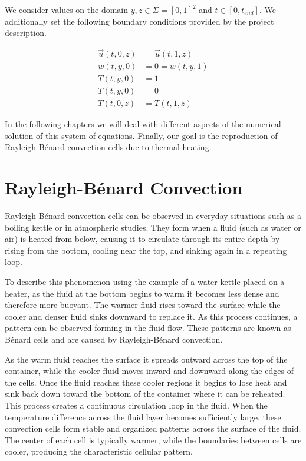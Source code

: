 We consider values on the domain $y,z \in \Sigma = [0,1]^2$ and $t \in [0, t_{end}]$.
We additionally set the following boundary conditions provided by the project description. 


\begin{align}
\vec u (t,0,z) &= \vec u (t,1,z) \\
w(t,y,0) &= 0 = w(t,y,1) \\
T(t,y,0) &= 1 \\
T(t,y,0) &= 0 \\
T(t,0,z) &= T(t,1,z) 
\end{align}

In the following chapters we will deal with different aspects of the numerical solution of this system of equations.
Finally, our goal is the reproduction of Rayleigh-B\'{e}nard convection cells due to thermal heating.






\section{Rayleigh-B\'{e}nard Convection}

Rayleigh-B\'{e}nard convection cells can be observed in everyday situations such as a boiling kettle or in atmospheric studies. They form when a fluid (such as water or air) is heated from below, causing it to circulate through its entire depth by rising from the bottom, cooling near the top, and sinking again in a repeating loop.

To describe this phenomenon using the example of a water kettle placed on a heater, as the fluid at the bottom begins to warm it becomes less dense and therefore more buoyant. The warmer fluid rises toward the surface while the cooler and denser fluid sinks downward to replace it. As this process continues, a pattern can be observed forming in the fluid flow. These patterns are known as B\'{e}nard cells and are caused by Rayleigh-B\'{e}nard convection.

As the warm fluid reaches the surface it spreads outward across the top of the container, while the cooler fluid moves inward and downward along the edges of the cells. Once the fluid reaches these cooler regions it begins to lose heat and sink back down toward the bottom of the container where it can be reheated. This process creates a continuous circulation loop in the fluid. When the temperature difference across the fluid layer becomes sufficiently large, these convection cells form stable and organized patterns across the surface of the fluid. The center of each cell is typically warmer, while the boundaries between cells are cooler, producing the characteristic cellular pattern.


